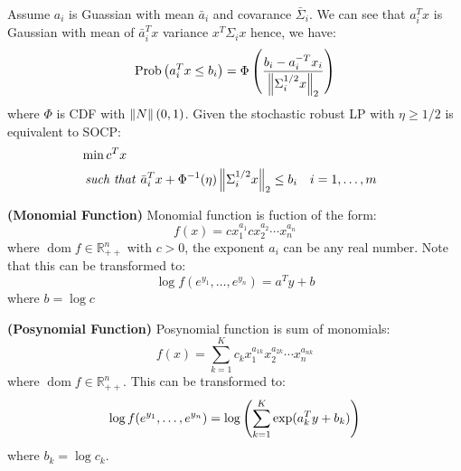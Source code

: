 \begin{proposition}
    Assume $a_i$ is Guassian with mean $\bar{a}_i$ and covarance $\bar{\Sigma}_i$. We can see that $a_i^Tx$ is Gaussian with mean of $\bar{a}^T_ix$ variance $x^T\Sigma_ix$ hence, we have:
    \begin{equation*}
        \operatorname{Prob}\left( a_i^Tx \le b_i \right) = \Phi\left( \frac{b_i - a_i^{-T}x_i}{\left\lVert\Sigma^{1/2}_ix\right\rVert_2} \right)
    \end{equation*}
    where $\Phi$ is CDF with $\left\lVert N\right\rVert(0, 1)$. Given the stochastic robust LP with $\eta\ge1/2$ is equivalent to SOCP:
    \begin{equation*}
    \begin{aligned}
        &\min c^Tx \\
        &\text{\emph{ such that }} \begin{aligned}[t]
            &\bar{a}^T_ix + \Phi^{-1}(\eta)\left\lVert\Sigma^{1/2}_ix\right\rVert_2\le b_i \quad i =1,\dots,m
        \end{aligned}
    \end{aligned}
    \end{equation*}
\end{proposition}

\begin{definition}{\textbf{(Monomial Function)}}
    Monomial function is fuction of the form:
    \begin{equation*}
        f(x) = cx^{a_1}_1cx^{a_2}_2\cdots x^{a_n}_n
    \end{equation*}
    where $\operatorname{dom} f \in \mathbb{R}^n_{++}$ with $c>0$, the exponent $a_i$ can be any real number. Note that this can be transformed to:
    \begin{equation*}
        \log f(e^{y_1},\dots,e^{y_n}) = a^Ty+b
    \end{equation*}
    where $b = \log c$
\end{definition}

\begin{definition}{\textbf{(Posynomial Function)}}
    Posynomial function is sum of monomials:
    \begin{equation*}
        f(x) = \sum^K_{k=1}c_kx^{a_{1k}}_1 x^{a_{2k}}_2\cdots x^{a_{nk}}_n
    \end{equation*}
    where $\operatorname{dom} f \in \mathbb{R}^n_{++}$. This can be transformed to:
    \begin{equation*}
        \log f(e^{y_1},\dots,e^{y_n}) =\log\left( \sum^K_{k=1}\exp(a_k^Ty+b_k) \right)
    \end{equation*}
    where $b_k = \log c_k$.
\end{definition}

